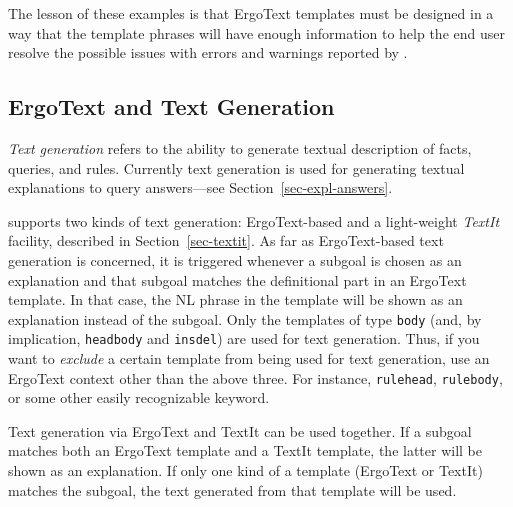 The lesson of these examples is that ErgoText templates must be
designed in a way that the template phrases will
have enough information to help the end user resolve the possible issues
with errors and warnings reported by \FLSYSTEM.


\subsection{ErgoText and Text Generation}\label{sec-ergo-textgen}

\emph{Text generation}   refers to the ability to generate textual
description of \ERGO facts, queries, and rules. Currently text generation
is used for generating textual explanations to query answers---see
Section~\ref{sec-expl-answers}.

\ERGO supports two kinds of text generation: ErgoText-based and a
light-weight \emph{TextIt} facility, described in Section~\ref{sec-textit}.
As far as ErgoText-based text generation is concerned, it is triggered
whenever a subgoal is chosen as an explanation
and that subgoal matches the definitional part in an ErgoText template. In
that case,
the NL phrase in the template will be shown as an explanation
instead of the subgoal.
Only the templates of type \texttt{body} (and, by implication,
\texttt{headbody} and \texttt{insdel}) are used for text generation.
Thus, if you want to \emph{exclude} a certain template from being used for text
generation, use an ErgoText context other than the above three. For instance,
\texttt{rulehead}, \texttt{rulebody}, or some other easily recognizable  
keyword.

Text generation via ErgoText and TextIt can be used together.
If a subgoal matches both an ErgoText template and a TextIt template,
the latter will be shown as an explanation. If only one kind of a template
(ErgoText or TextIt) matches the subgoal, the text generated from that
template will be used.



